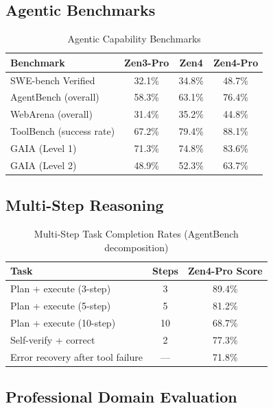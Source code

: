 \documentclass[11pt,a4paper]{article}
\begin{document}
\subsection{Agentic Benchmarks}

\begin{table}[H]
\centering
\begin{tabular}{lccc}
\toprule
\textbf{Benchmark} & \textbf{Zen3-Pro} & \textbf{Zen4} & \textbf{Zen4-Pro} \\
\midrule
SWE-bench Verified       & 32.1\% & 34.8\% & 48.7\% \\
AgentBench (overall)     & 58.3\% & 63.1\% & 76.4\% \\
WebArena (overall)       & 31.4\% & 35.2\% & 44.8\% \\
ToolBench (success rate) & 67.2\% & 79.4\% & 88.1\% \\
GAIA (Level 1)           & 71.3\% & 74.8\% & 83.6\% \\
GAIA (Level 2)           & 48.9\% & 52.3\% & 63.7\% \\
\bottomrule
\end{tabular}
\caption{Agentic Capability Benchmarks}
\end{table}

\subsection{Multi-Step Reasoning}

\begin{table}[H]
\centering
\begin{tabular}{lcc}
\toprule
\textbf{Task} & \textbf{Steps} & \textbf{Zen4-Pro Score} \\
\midrule
Plan + execute (3-step)   & 3  & 89.4\% \\
Plan + execute (5-step)   & 5  & 81.2\% \\
Plan + execute (10-step)  & 10 & 68.7\% \\
Self-verify + correct     & 2  & 77.3\% \\
Error recovery after tool failure & --- & 71.8\% \\
\bottomrule
\end{tabular}
\caption{Multi-Step Task Completion Rates (AgentBench decomposition)}
\end{table}

\subsection{Professional Domain Evaluation}
\end{document}
